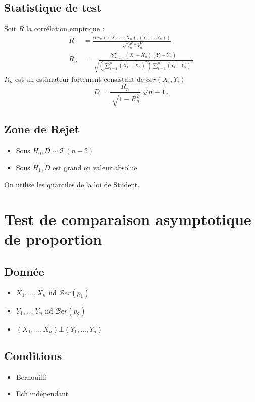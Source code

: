 \documentclass{article}
\theoremstyle{plain}%
\theoremstyle{definition}
\theoremstyle{remark}
\begin{document}
\subsection*{Statistique de test}
Soit $ R $ la corrélation empirique :
\begin{align*}
    R &= \frac{cov_n( (X_1, \dots, X_n), (Y_1, \dots, Y_n) )}{\sqrt[]{V_n^X*V_n^Y}} \\
    R_n &= \frac{\sum_{i=1}^{n} (X_i - \bar{X}_n) (Y_i - \bar{Y}_n)}{\sqrt[]{(\sum_{i=1}^{n} (X_i - \bar{X}_n)^2) \sum_{i=1}^{n} (Y_i - \bar{Y}_n)^2 }}
\end{align*}
$ R_n $ est un estimateur fortement consistant de $ cor(X_i, Y_i) $
\[
    D = \frac{R_n}{\sqrt[]{1 - R_n^2}} \sqrt[]{n-1}
.\]

\subsection*{Zone de Rejet}
\begin{itemize}
    \item Sous $ H_0, D \sim \mathcal{T}(n-2) $ 
    \item Sous $ H_1, D $ est grand en valeur absolue
\end{itemize}
On utilise les quantiles de la loi de Student.

\section{Test de comparaison asymptotique de proportion}
\subsection*{Donnée}
\begin{itemize}
    \item $ X_1, \dots, X_n $ iid $ \mathcal{B}er(p_1) $ 
    \item $ Y_1, \dots, Y_n $ iid $ \mathcal{B}er(p_2) $ 
    \item $ (X_1, \dots, X_n) \bot (Y_1, \dots, Y_n) $
\end{itemize}

\subsection*{Conditions}
\begin{itemize}
    \item Bernouilli
    \item Ech indépendant
\end{itemize}
\end{document}
